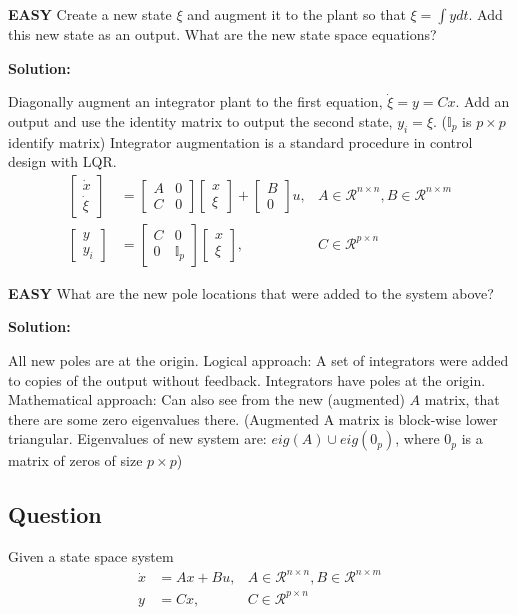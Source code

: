 \documentclass{article}
\newenvironment{Solution}{
\begin{tcolorbox}
\color{purple}
\textbf{Solution:}
}
{
\end{tcolorbox}
\ignorespacesafterend
}
\newcommand{\RatingBase}[2]{\textcolor{#1}{{\fontfamily{phv}\selectfont\textbf{#2}}}}
\newcommand{\Easy}{\RatingBase{green!50!black!50}{EASY}}
\begin{document}
\Easy{}
Create a new state $\xi$ and augment it to the plant so that $\xi = \int y dt$.  Add this new state as an output.  What are the new state space equations?

\newcommand{\VectorJF}[1]{\ensuremath{\left[\begin{matrix}  #1 \end{matrix}\right]}}
\begin{Solution}
Diagonally augment an integrator plant to the first equation, $\dot{\xi}=y = Cx$.  Add an output and use the identity matrix to output the second state, $y_i=\xi$.  ($\mathbb{I}_p$ is $p \times p$ identify matrix) Integrator augmentation is a standard procedure in control design with LQR.
	\begin{align}
		\VectorJF{\dot{x} \\ \dot{\xi}}&=\VectorJF{A & 0 \\ C & 0}\VectorJF{x\\ \xi} + \VectorJF{B\\0} u,  &A\in\mathcal{R}^{n\times n}, B\in \mathcal{R}^{n \times m} \\
		\VectorJF{y\\ y_i} &= \VectorJF{C & 0\\ 0 & \mathbb{I}_p}\VectorJF{x\\ \xi},  &C \in \mathcal{R}^{p \times  n}
	\end{align}
\end{Solution}
\Easy{} What are the new pole locations that were added to the system above?
\begin{Solution}
	All new poles are at the origin.  Logical approach: A set of integrators were added to copies of the output without feedback.  Integrators have poles at the origin.  Mathematical approach: Can also see from the new (augmented) $A$ matrix, that there are some zero eigenvalues there.  (Augmented A matrix is block-wise lower triangular.  Eigenvalues of new system are:  $eig(A) \cup eig(0_p)$, where $0_p$ is a matrix of zeros of size $p\times p$)
\end{Solution}

\subsection{Question}
Given a state space system
\begin{align}
\dot{x}&=Ax + Bu,  &A\in\mathcal{R}^{n\times n}, B\in \mathcal{R}^{n \times m} \\
y &= Cx,  &C \in \mathcal{R}^{p \times  n}
\end{align}
\end{document}

